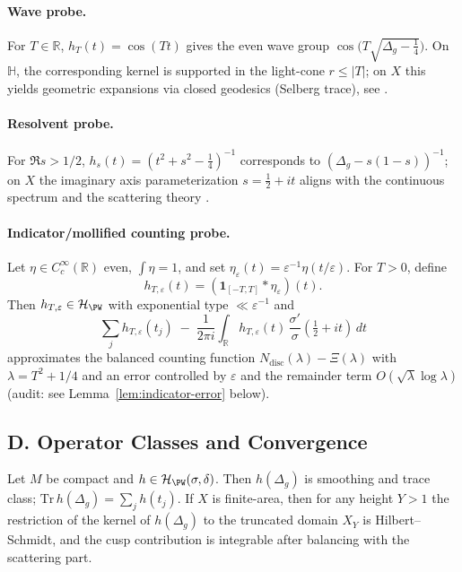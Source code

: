\paragraph{Wave probe.}
For $T\in\mathbb R$, $h_T(t)=\cos(Tt)$ gives the even wave group $\cos\!\big(T\sqrt{\Delta_g-\tfrac14}\big)$.
On $\mathbb H$, the corresponding kernel is supported in the light-cone $r\le |T|$; on $X$ this yields geometric expansions via closed geodesics (Selberg trace), see \cite{Selberg1956,Hejhal1983}.

\paragraph{Resolvent probe.}
For $\Re s>1/2$, $h_s(t)=(t^2+s^2-\tfrac14)^{-1}$ corresponds to $(\Delta_g-s(1-s))^{-1}$; on $X$ the imaginary axis parameterization $s=\tfrac12+it$ aligns with the continuous spectrum and the scattering theory \cite{LaxPhillips1976}.

\paragraph{Indicator/mollified counting probe.}
Let $\eta\in C_c^\infty(\mathbb R)$ even, $\int\eta=1$, and set $\eta_\varepsilon(t)=\varepsilon^{-1}\eta(t/\varepsilon)$. For $T>0$, define
\[
  h_{T,\varepsilon}(t)=(\mathbf 1_{[-T,T]}*\eta_\varepsilon)(t).
\]
Then $h_{T,\varepsilon}\in \mathcal H_{\PW}$ with exponential type $\ll \varepsilon^{-1}$ and
\[
  \sum_j h_{T,\varepsilon}(t_j) \;-\; \frac{1}{2\pi i}\int_{\mathbb R} h_{T,\varepsilon}(t)\,\frac{\sigma'}{\sigma}(\tfrac12+it)\,dt
\]
approximates the balanced counting function $N_{\mathrm{disc}}(\lambda)-\Xi(\lambda)$ with $\lambda=T^2+1/4$ and an error controlled by $\varepsilon$ and the remainder term $O(\sqrt{\lambda}\log\lambda)$ (audit: see Lemma~\ref{lem:indicator-error} below).


\subsection*{D. Operator Classes and Convergence}
\label{subsec:operator-classes}

\begin{lemma}
\label{lem:tc-hs}
Let $M$ be compact and $h\in\mathcal H_{\PW}(\sigma,\delta)$. Then $h(\Delta_g)$ is smoothing and trace class; $\mathrm{Tr}\,h(\Delta_g)=\sum_j h(t_j)$.
If $X$ is finite-area, then for any height $Y>1$ the restriction of the kernel of $h(\Delta_g)$ to the truncated domain $X_Y$ is Hilbert–Schmidt, and the cusp contribution is integrable after balancing with the scattering part.
\end{lemma}

